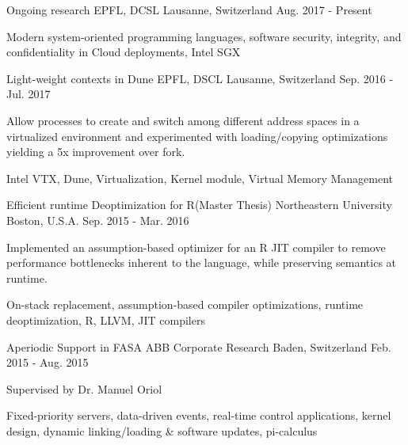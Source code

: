 


\begin{cventries}

\cventry
{Ongoing research}
{EPFL, DCSL}
{Lausanne, Switzerland}
{Aug. 2017 - Present}
{
	\begin{cvitems}
	\item{Modern system-oriented programming languages, software security, integrity, and confidentiality in Cloud deployments, Intel SGX}
	\end{cvitems}
}


\cventry
{Light-weight contexts in Dune}
{EPFL, DSCL}
{Lausanne, Switzerland}
{Sep. 2016 - Jul. 2017}
{
	\begin{cvitems}
	\item{Allow processes to create and switch among different address spaces in a virtualized environment and experimented with loading/copying optimizations yielding a 5x improvement over fork.}
	\item{Intel VTX, Dune, Virtualization, Kernel module, Virtual Memory Management}
	\end{cvitems}
}

\cventry
{Efficient runtime Deoptimization for R(Master Thesis)} %
{Northeastern University} %
{Boston, U.S.A.} %
{Sep. 2015 - Mar. 2016} %
{ %
\begin{cvitems}
\item{Implemented an assumption-based optimizer for an R JIT compiler to remove performance bottlenecks inherent to the language, while preserving semantics at runtime.}
\item {On-stack replacement, assumption-based compiler optimizations, runtime deoptimization, R, LLVM, JIT compilers}
\end{cvitems}
}

\cventry
{Aperiodic Support in FASA}
{ABB Corporate Research}
{Baden, Switzerland}
{Feb. 2015 - Aug. 2015}
{
	\begin{cvitems}
	\item{Supervised by Dr. Manuel Oriol}
	\item{Fixed-priority servers, data-driven events, real-time control applications, kernel design, dynamic linking/loading \& software updates, pi-calculus}
	\end{cvitems}
}


\end{cventries}

